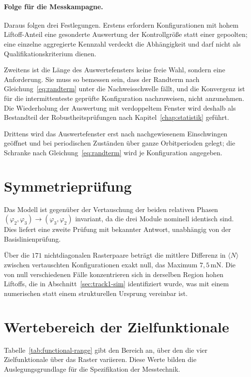 \documentclass[12pt,a4paper]{report}
\begin{document}
\paragraph{Folge für die Messkampagne.}
Daraus folgen drei Festlegungen. Erstens erfordern Konfigurationen mit
hohem Liftoff-Anteil eine gesonderte Auswertung der Kontrollgröße statt
einer gepoolten; eine einzelne aggregierte Kennzahl verdeckt die
Abhängigkeit und darf nicht als Qualifikationskriterium dienen.

Zweitens ist die Länge des Auswertefensters keine freie Wahl, sondern
eine Anforderung. Sie muss so bemessen sein, dass der Randterm nach Gleichung~\eqref{eq:randterm} unter die Nachweisschwelle fällt, und die
Konvergenz ist für die intermittenteste geprüfte Konfiguration
nachzuweisen, nicht anzunehmen. Die Wiederholung der Auswertung mit
verdoppeltem Fenster wird deshalb als Bestandteil der
Robustheitsprüfungen nach Kapitel~\ref{chap:statistik} geführt.

Drittens wird das Auswertefenster erst nach nachgewiesenem Einschwingen
geöffnet und bei periodischen Zuständen über ganze Orbitperioden gelegt;
die Schranke nach Gleichung~\eqref{eq:randterm} wird je Konfiguration
angegeben.

\section{Symmetrieprüfung}

Das Modell ist gegenüber der Vertauschung der beiden relativen Phasen
$(\varphi_2, \varphi_3) \rightarrow (\varphi_3, \varphi_2)$ invariant, da
die drei Module nominell identisch sind. Dies liefert eine zweite Prüfung
mit bekannter Antwort, unabhängig von der Basislinienprüfung.

Über die $171$ nichtdiagonalen Rasterpaare beträgt die mittlere Differenz
in $\langle N \rangle$ zwischen vertauschten Konfigurationen exakt null,
das Maximum $7{,}5\,\mathrm{mN}$. Die von null verschiedenen Fälle
konzentrieren sich in derselben Region hohen Liftoffs, die in
Abschnitt~\ref{sec:track1-sim} identifiziert wurde, was mit einem
numerischen statt einem strukturellen Ursprung vereinbar ist.

\section{Wertebereich der Zielfunktionale}
\label{sec:wertebereich}

Tabelle~\ref{tab:functional-range} gibt den Bereich an, über den die vier
Zielfunktionale über das Raster variieren. Diese Werte bilden die
Auslegungsgrundlage für die Spezifikation der Messtechnik.
\end{document}
